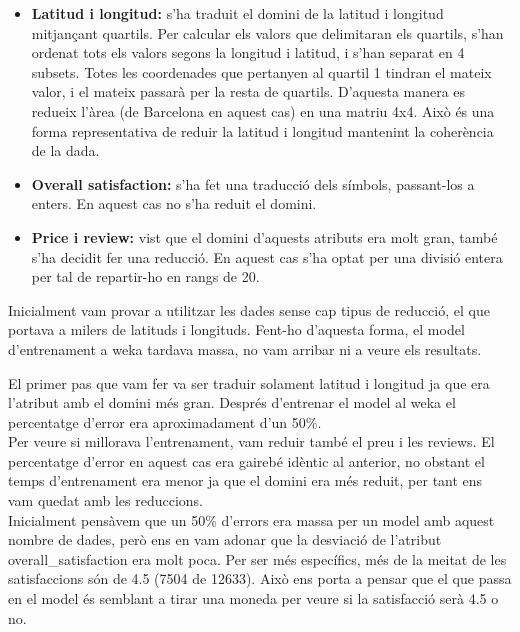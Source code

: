 \documentclass{article}
\begin{document}
\begin{itemize}
	\item \textbf{Latitud i longitud:} s'ha traduit el domini de la latitud i longitud 
	mitjançant quartils.
	Per calcular els valors que delimitaran els quartils, s'han ordenat tots els 
	valors segons la longitud i latitud, i s'han separat en 4 subsets. Totes les 
	coordenades que pertanyen al quartil 1 tindran el mateix valor, i el mateix
	passarà per la resta de quartils.
	D'aquesta manera es redueix l'àrea
	(de Barcelona en aquest cas) en una matriu 4x4. Això és una forma 
	representativa de reduir la latitud i longitud mantenint la coherència de la
	dada.

	\item \textbf{Overall satisfaction:} s'ha fet una traducció dels símbols, 
	passant-los a enters. En aquest cas no s'ha reduit el domini.

	\item \textbf{Price i review:} vist que el domini d'aquests atributs era molt 
	gran, també s'ha decidit fer una reducció. En aquest cas s'ha optat per 
	una divisió entera per tal de repartir-ho en rangs de 20.
\end{itemize}

Inicialment vam provar a utilitzar les dades sense cap tipus de reducció, el que
portava a milers de latituds i longituds. Fent-ho d'aquesta forma, el model 
d'entrenament a weka tardava massa, no vam arribar ni a veure els resultats.

El primer pas que vam fer va ser traduir solament latitud i longitud ja que era
l'atribut amb el domini més gran. Després d'entrenar el model al weka el 
percentatge d'error era aproximadament d'un 50\%.\\

Per veure si millorava l'entrenament, vam reduir també el preu i les reviews. El
percentatge d'error en aquest cas era gairebé idèntic al anterior, no obstant 
el temps d'entrenament era menor ja que el domini era més reduit, per tant 
ens vam quedat amb les reduccions.\\

Inicialment pensàvem que un 50\% d'errors era massa per un model amb aquest nombre 
de dades, però ens en vam adonar que la desviació de l'atribut overall\_satisfaction 
era molt poca. Per ser més específics, més de la meitat de les satisfaccions són 
de 4.5 (7504 de 12633).
Això ens porta a pensar que el que passa en el model és semblant a 
tirar una moneda per veure si la satisfacció serà 4.5 o no.  
\end{document}
